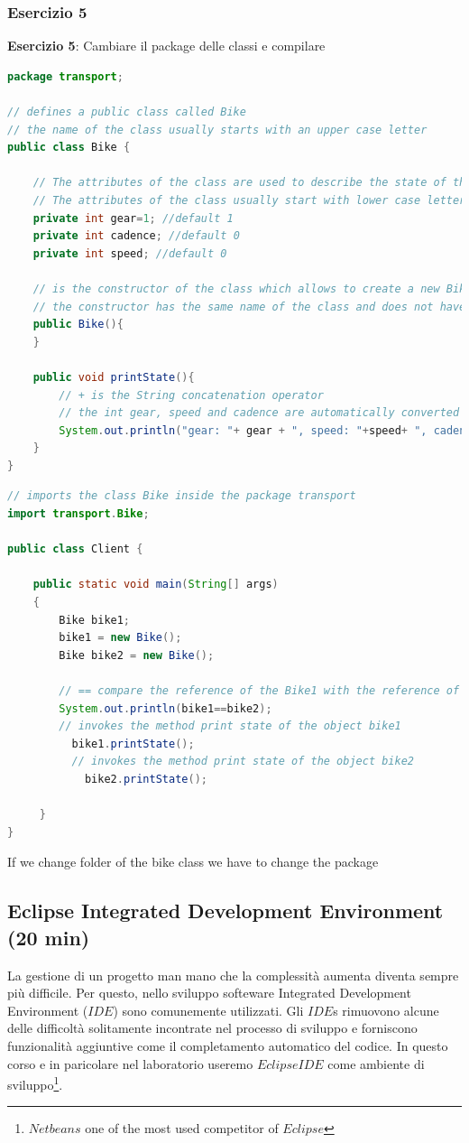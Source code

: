 \documentclass{article}
\theoremstyle{definition}
\begin{document}
\subsubsection{Esercizio 5}
\begin{framed}
\textbf{Esercizio 5}: Cambiare il package delle classi e compilare
\end{framed}
\begin{lstlisting}[language=Java,escapechar=|]
package transport;

// defines a public class called Bike 
// the name of the class usually starts with an upper case letter
public class Bike {
	
	// The attributes of the class are used to describe the state of the class and are usually private or protected 
	// The attributes of the class usually start with lower case letters
	private int gear=1; //default 1
	private int cadence; //default 0
	private int speed; //default 0
	
	// is the constructor of the class which allows to create a new Bike
	// the constructor has the same name of the class and does not have a return type
	public Bike(){
	}
	
	public void printState(){
	    // + is the String concatenation operator
	    // the int gear, speed and cadence are automatically converted into String
		System.out.println("gear: "+ gear + ", speed: "+speed+ ", cadence: "+cadence);
	}
}
\end{lstlisting}

\begin{lstlisting}[language=Java,escapechar=|]
// imports the class Bike inside the package transport
import transport.Bike;

public class Client {
	
	public static void main(String[] args)
    {
        Bike bike1; 
        bike1 = new Bike();
        Bike bike2 = new Bike(); 
        
        // == compare the reference of the Bike1 with the reference of the Bike2
        System.out.println(bike1==bike2);
        // invokes the method print state of the object bike1       
          bike1.printState();
          // invokes the method print state of the object bike2
            bike2.printState();

     }
}
\end{lstlisting}

If we change folder of the bike class we have to change the package

\subsection{Eclipse Integrated Development Environment  (20 min)}
La gestione di un progetto man mano che la complessit\`a aumenta diventa sempre pi\`u difficile. Per questo, nello sviluppo softeware  Integrated Development Environment ($IDE$) sono comunemente utilizzati. Gli $IDE$s rimuovono alcune delle difficolt\`a solitamente incontrate nel processo di sviluppo e forniscono funzionalit\`a aggiuntive come il completamento automatico del codice. In questo corso e in paricolare nel laboratorio useremo $Eclipse IDE$ come ambiente di sviluppo\footnote{$Netbeans$ one of the most used competitor of $Eclipse$}.  
\end{document}
